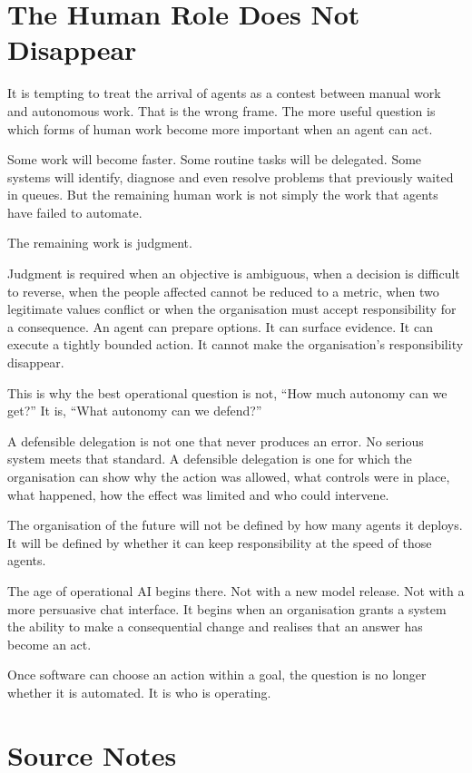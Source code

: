 \section{The Human Role Does Not
Disappear}\label{the-human-role-does-not-disappear}

It is tempting to treat the arrival of agents as a contest between
manual work and autonomous work. That is the wrong frame. The more
useful question is which forms of human work become more important when
an agent can act.

Some work will become faster. Some routine tasks will be delegated. Some
systems will identify, diagnose and even resolve problems that
previously waited in queues. But the remaining human work is not simply
the work that agents have failed to automate.

The remaining work is judgment.

Judgment is required when an objective is ambiguous, when a decision is
difficult to reverse, when the people affected cannot be reduced to a
metric, when two legitimate values conflict or when the organisation
must accept responsibility for a consequence. An agent can prepare
options. It can surface evidence. It can execute a tightly bounded
action. It cannot make the organisation's responsibility disappear.

This is why the best operational question is not, ``How much autonomy
can we get?'' It is, ``What autonomy can we defend?''

A defensible delegation is not one that never produces an error. No
serious system meets that standard. A defensible delegation is one for
which the organisation can show why the action was allowed, what
controls were in place, what happened, how the effect was limited and
who could intervene.

The organisation of the future will not be defined by how many agents it
deploys. It will be defined by whether it can keep responsibility at the
speed of those agents.

The age of operational AI begins there. Not with a new model release.
Not with a more persuasive chat interface. It begins when an
organisation grants a system the ability to make a consequential change
and realises that an answer has become an act.

Once software can choose an action within a goal, the question is no
longer whether it is automated. It is who is operating.

\section{Source Notes}\label{source-notes}

